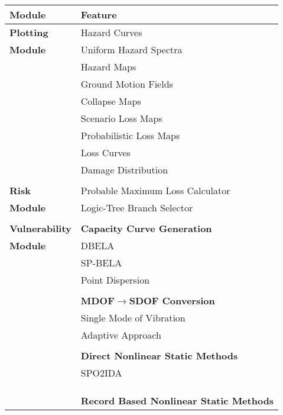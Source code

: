 \begin{table}[!htbp]
\centering
\begin{tabular}{|l|l|} \hline
\textbf{Module}     & \textbf{Feature} \\ \hline
\textbf{Plotting}   & Hazard Curves \\
\textbf{Module}     & Uniform Hazard Spectra \\
                    & Hazard Maps \\
                    & Ground Motion Fields \\
                    & Collapse Maps \\
                    & Scenario Loss Maps \\
                    & Probabilistic Loss Maps \\
                    & Loss Curves \\
                    & Damage Distribution \\
                    & \\ \hline
\textbf{Risk}       & Probable Maximum Loss Calculator \\
\textbf{Module}     & Logic-Tree Branch Selector \\
                    & \\ \hline
\textbf{Vulnerability} & \textbf{Capacity Curve Generation} \\
\textbf{Module}        & DBELA \\
                    & SP-BELA \\
                    & Point Dispersion \\
                    & \\
                    & \textbf{MDOF$\to$SDOF Conversion} \\
                    & Single Mode of Vibration \\
                    & Adaptive Approach \\
                    & \\
                    & \textbf{Direct Nonlinear Static Methods} \\
                    & SPO2IDA \citep{VamvatsikosCornell2005} \\
                    & \citet{DolsekFajfar2004} \\
                    & \citet{RuizGarciaMiranda2007} \\
                    & \\
                    & \textbf{Record Based Nonlinear Static Methods} \\

\end{tabular}
\end{table}
